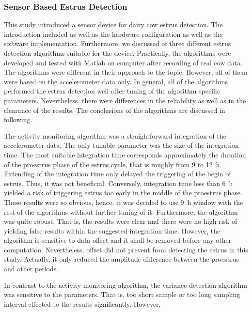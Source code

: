 \documentclass[english,12pt,a4paper,pdftex,elec,utf8]{aaltothesis}
\begin{document}
\subsubsection{Sensor Based Estrus Detection}

This study introduced a sensor device for dairy cow estrus detection. The introduction included as well as the hardware configuration as well as the software implementation. Furthermore, we discussed of three different estrus detection algorithms suitable for the device. Practically, the algorithms were developed and tested with Matlab on computer after recording of real cow data. The algorithms were different in their approach to the topic. However, all of them were based on the accelerometer data only. In general, all of the algorithms performed the estrus detection well after tuning of the algorithm specific parameters. Nevertheless, there were differences in the reliability as well as in the clearance of the results. The conclusions of the algorithms are discussed in following.

The activity monitoring algorithm was a straightforward integration of the accelerometer data. The only tunable parameter was the size of the integration time. The most suitable integration time corresponds approximately the duration of the proestrus phase of the estrus cycle, that is roughly from 9 to \SI{12}{\hour}. Extending of the integration time only delayed the triggering of the begin of estrus. Thus, it was not beneficial. Conversely, integration time less than \SI{6}{\hour} yielded a risk of triggering estrus too early in the middle of the proestrus phase. These results were so obvious, hence, it was decided to use \SI{9}{\hour} window with the rest of the algorithms without further tuning of it. Furthermore, the algorithm was quite robust. That is, the results were clear and there were no high risk of yielding false results within the suggested integration time. However, the algorithm is sensitive to data offset and it shall be removed before any other computation. Nevertheless, offset did not prevent from detecting the estrus in this study. Actually, it only reduced the amplitude difference between the proestrus and other periods.

In contrast to the activity monitoring algorithm, the variance detection algorithm was sensitive to the parameters. That is, too short sample or too long sampling interval effected to the results significantly. However, 
\end{document}
